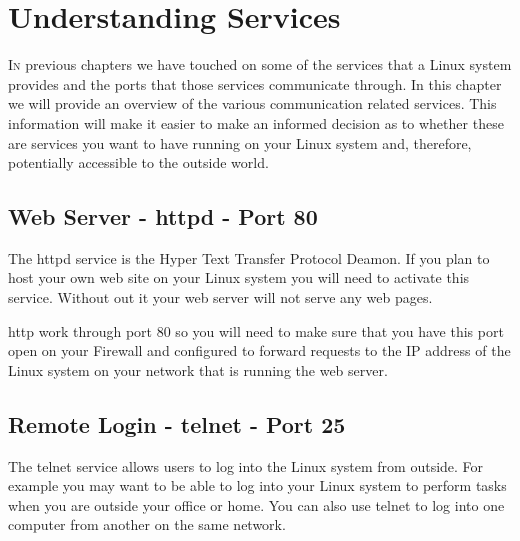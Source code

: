 \subsubsectionend

\subsectionend

\sectionend

\section{{Understanding Services}}
\label{sec:understanding_services}

\lettrine[lines=3, findent=3pt, nindent=0pt]{I}{n} previous chapters we have
touched on some of the services that a Linux system provides and the ports that
those services communicate through. In this chapter we will provide an overview
of the various communication related services. This information will make it
easier to make an informed decision as to whether these are services you want to
have running on your Linux system and, therefore, potentially accessible to the
outside world. 



\subsection{Web Server - httpd - Port 80}
\label{ssec:web_server_httpd_port_80}

The httpd service is the Hyper Text Transfer Protocol Deamon. If you plan to
host your own web site on your Linux system you will need to activate this
service. Without out it your web server will not serve any web pages.\



http work through port 80 so you will need to make sure that you have this port
open on your Firewall and configured to forward requests to the IP address of
the Linux system on your network that is running the web server.



\subsectionend

\subsection{Remote Login - telnet - Port 25}
\label{ssec:remote_login_telnet_port_25}

The telnet service allows users to log into the Linux system from outside. For
example you may want to be able to log into your Linux system to perform tasks
when you are outside your office or home. You can also use telnet to log into
one computer from another on the same network.



